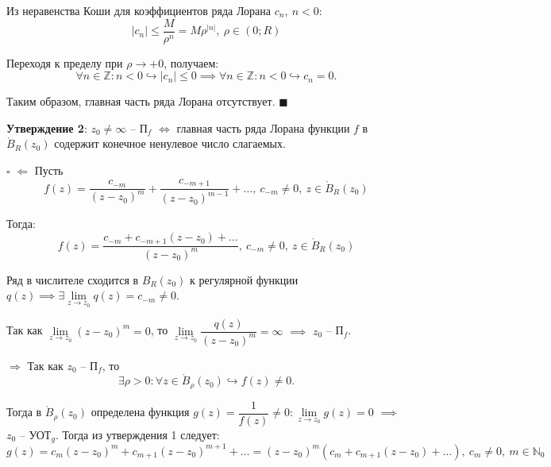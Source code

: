 \documentclass[12pt, a4paper, reqno]{article}
\begin{document}
    Из неравенства Коши для коэффициентов ряда Лорана $c_n,\ n < 0$:
    \begin{equation*}
        |c_n| \leq \frac{M}{\rho^n} = M\rho^{|n|},\ \rho \in (0; R)
    \end{equation*}

    Переходя к пределу при $\rho \to +0$, получаем:
    \begin{equation*}
        \forall n \in \mathbb{Z}: n < 0 \hookrightarrow |c_n| \leq 0 \implies
        \forall n \in \mathbb{Z}: n < 0 \hookrightarrow c_n = 0.
    \end{equation*}

    Таким образом, главная часть ряда Лорана отсутствует. $\blacksquare$

    \textbf{Утверждение 2}: $z_0 \neq \infty$ -- П$_f$ $\iff$ главная часть ряда Лорана функции
    $f$ в $\mathring B_R(z_0)$ содержит конечное ненулевое число слагаемых.

    $\square$ $\boxed{\Leftarrow}$ Пусть
    \begin{equation*}
        f(z) = \frac{c_{-m}}{(z - z_0)^m} + \frac{c_{-m + 1}}{(z - z_0)^{m - 1}} + \ldots,\
        c_{-m} \neq 0,\ z \in \mathring B_R(z_0)
    \end{equation*}

    Тогда:
    \begin{equation*}
        f(z) = \frac{c_{-m} + c_{-m + 1}(z - z_0) + \ldots}{(z - z_0)^m},\ c_{-m} \neq 0,\
        z \in \mathring B_R(z_0)
    \end{equation*}

    Ряд в числителе сходится в $B_R(z_0)$ к регулярной функции $q(z) \implies \exists
    \lim\limits_{z \to z_0} q(z) = c_{-m} \neq 0$.

    Так как $\lim\limits_{z \to z_0} (z - z_0)^m = 0$, то
    $\lim\limits_{z \to z_0} \dfrac{q(z)}{(z - z_0)^m} = \infty$ $\implies$ $z_0$ -- П$_f$.

    $\boxed{\Rightarrow}$ Так как $z_0$ -- П$_f$, то
    \begin{equation*}
        \exists \rho > 0: \forall z \in \mathring B_{\rho}(z_0) \hookrightarrow f(z) \neq 0.
    \end{equation*}

    Тогда в $\mathring B_{\rho}(z_0)$ определена функция $g(z) = \dfrac{1}{f(z)} \neq 0:
    \lim\limits_{z \to z_0} g(z) = 0$ $\implies$ $z_0$ -- УОТ$_g$. Тогда из утверждения 1 следует:
    \begin{equation*}
        g(z) = c_m(z - z_0)^m + c_{m + 1}(z - z_0)^{m + 1} + \ldots =
        (z - z_0)^m (c_m + c_{m + 1}(z - z_0) + \ldots),\ c_m \neq 0,\ m \in \mathbb{N}_0
    \end{equation*}
\end{document}
